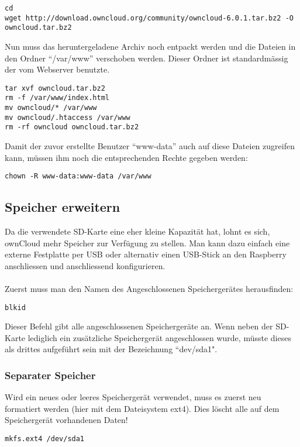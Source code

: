 \begin{lstlisting}
cd
wget http://download.owncloud.org/community/owncloud-6.0.1.tar.bz2 -O owncloud.tar.bz2
\end{lstlisting}

Nun muss das heruntergeladene Archiv noch entpackt werden und die Dateien in den Ordner ``/var/www'' verschoben werden. Dieser Ordner ist standardmässig der vom Webserver benutzte.
\\

\begin{lstlisting}
tar xvf owncloud.tar.bz2
rm -f /var/www/index.html
mv owncloud/* /var/www
mv owncloud/.htaccess /var/www
rm -rf owncloud owncloud.tar.bz2
\end{lstlisting}


Damit der zuvor erstellte Benutzer ``www-data'' auch auf diese Dateien zugreifen kann, müssen ihm noch die entsprechenden Rechte gegeben werden:
\\

\begin{lstlisting}
chown -R www-data:www-data /var/www
\end{lstlisting}

\subsection{Speicher erweitern}
Da die verwendete SD-Karte eine eher kleine Kapazität hat, lohnt es sich, ownCloud mehr Speicher zur Verfügung zu stellen. Man kann dazu einfach eine externe Festplatte per USB oder alternativ einen USB-Stick an den Raspberry anschliessen und anschliessend konfigurieren.
\\
\\
Zuerst muss man den Namen des Angeschlossenen Speichergerätes herausfinden: 
\\

\begin{lstlisting}
blkid
\end{lstlisting}

Dieser Befehl gibt alle angeschlossenen Speichergeräte an. Wenn neben der SD-Karte lediglich ein zusätzliche Speichergerät angeschlossen wurde, müsste dieses als drittes aufgeführt sein mit der Bezeichnung ``dev/sda1".

\subsubsection{Separater Speicher}
Wird ein neues oder leeres Speichergerät verwendet, muss es zuerst neu formatiert werden (hier mit dem Dateisystem ext4). Dies löscht alle auf dem Speichergerät vorhandenen Daten!
\\
\begin{lstlisting}
mkfs.ext4 /dev/sda1
\end{lstlisting}

